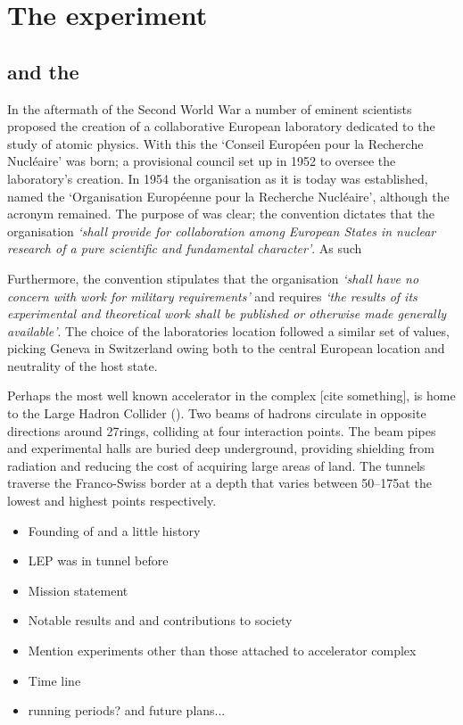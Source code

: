 \chapter{The \lhcb experiment} 
\label{ch:detector}
\minitoc
 


\section{\cern and the \lhc}


In the aftermath of the Second World War a number of eminent scientists proposed the creation of a collaborative European laboratory dedicated to the study of atomic physics. With this the `Conseil Europ\'een pour la Recherche Nucl\'eaire' was born; a provisional council set up in 1952 to oversee the laboratory's creation.  In 1954 the organisation as it is today was established, named the `Organisation Europ\'eenne pour la Recherche Nucl\'eaire', although the acronym \cern remained. 
The purpose of \cern was clear; the convention dictates that the organisation \emph{`shall provide for collaboration among European States in nuclear research of a pure scientific and fundamental character'}.
As such 

Furthermore, the convention stipulates that the organisation \emph{`shall have no concern with work for military requirements'} and  
requires \emph{`the results of its experimental and theoretical work shall be published or otherwise made generally available'}. 
The choice of the laboratories location followed a similar set of values, picking Geneva in Switzerland owing both to the central European location and neutrality of the host state. 


Perhaps the most well known accelerator in the complex [cite something], \cern is home to the Large Hadron Collider (\lhc). Two beams of hadrons circulate in opposite directions around 27\km rings, colliding at four interaction points. The beam pipes and experimental halls are buried deep underground, providing shielding from radiation and reducing the cost of acquiring large areas of land. The tunnels traverse the Franco-Swiss border at a depth that varies between 50--175\m at the lowest and highest points respectively.      


{\color{Red}
\begin{itemize}
\item Founding of \cern and a little history 
\item LEP was in tunnel before
\item Mission statement
\item Notable results and and contributions to society
\item Mention experiments other than those attached to accelerator complex
\item Time line
\item running periods? and future plans...
\end{itemize}
}

